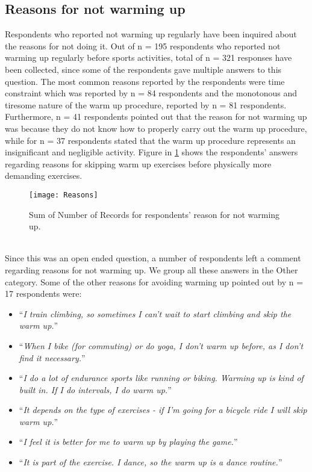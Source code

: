 \subsection{Reasons for not warming up}
Respondents who reported not warming up regularly have been inquired about the reasons for not doing it.  Out of n = 195 respondents who reported not warming up regularly before sports activities, total of n = 321 responses have been collected, since some of the respondents gave multiple answers to this question. The most common reasons reported by the respondents were time constraint which was reported by n = 84 respondents and the monotonous and tiresome nature of the warm up procedure, reported by n = 81 respondents. Furthermore, n = 41 respondents pointed out that the reason for not warming up was because they do not know how to properly carry out the warm up procedure, while for n = 37 respondents stated that the warm up procedure represents an insignificant and negligible activity. Figure in \ref{fig:Reasons} shows the respondents' answers regarding reasons for skipping warm up exercises before physically more demanding exercises.
\begin{figure}[h]
    \centering
    \texttt{[image: Reasons]}
    \caption{Sum of Number of Records for respondents' reason for not warming up.}
    \label{fig:Reasons}
\end{figure}\\
Since this was an open ended question, a number of respondents left a comment regarding reasons for not warming up. We group all these answers in the Other category. Some of the other reasons for avoiding warming up pointed out by n = 17 respondents were: 
\begin{itemize}
\item ``\textit{I train climbing, so sometimes I can't wait to start climbing and skip the warm up.}''
 \item ``\textit{When I bike (for commuting) or do yoga, I don't warm up before, as I don't find it necessary.}''
\item ``\textit{I do a lot of endurance sports like running or biking. Warming up is kind of built in. If I do intervals, I do warm up.}''
\item ``\textit{It depends on the type of exercises - if I'm going for a bicycle ride I will skip warm up.}''
\item ``\textit{I feel it is better for me to warm up by playing the game.}''
\item ``\textit{It is part of the exercise. I dance, so the warm up is a dance routine.}''
\end{itemize}
